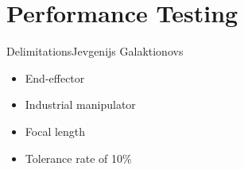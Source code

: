 \section {Performance Testing}

\begin{frame}{Delimitations}{Jevgenijs Galaktionovs}
\begin{itemize}
    \item End-effector
    \item Industrial manipulator
    \item Focal length
    \item Tolerance rate of 10\%
\end{itemize}
\begin{columns}
\centering{
}
\end{columns}
\end{frame}
